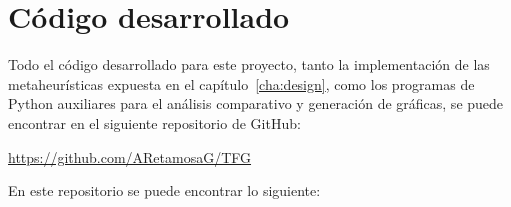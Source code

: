 %
%
%
% 
%
%
%
%


\chapter{Código desarrollado}
\label{code}

Todo el código desarrollado para este proyecto, tanto la implementación de las metaheurísticas expuesta en el
capítulo~\ref{cha:design}, como los programas de Python auxiliares para el análisis comparativo y generación de gráficas,
se puede encontrar en el siguiente repositorio de GitHub:

\url{https://github.com/ARetamosaG/TFG}

En este repositorio se puede encontrar lo siguiente:

